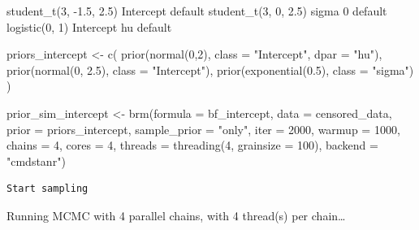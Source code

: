 \documentclass[
]{article}
\newenvironment{Shaded}{\begin{snugshade}}{\end{snugshade}}
\newcommand{\AttributeTok}[1]{\textcolor[rgb]{0.40,0.45,0.13}{#1}}
\newcommand{\DecValTok}[1]{\textcolor[rgb]{0.68,0.00,0.00}{#1}}
\newcommand{\FloatTok}[1]{\textcolor[rgb]{0.68,0.00,0.00}{#1}}
\newcommand{\FunctionTok}[1]{\textcolor[rgb]{0.28,0.35,0.67}{#1}}
\newcommand{\NormalTok}[1]{\textcolor[rgb]{0.00,0.23,0.31}{#1}}
\newcommand{\OtherTok}[1]{\textcolor[rgb]{0.00,0.23,0.31}{#1}}
\newcommand{\StringTok}[1]{\textcolor[rgb]{0.13,0.47,0.30}{#1}}
\begin{document}
student\_t(3, -1.5, 2.5) Intercept default student\_t(3, 0, 2.5) sigma 0
default logistic(0, 1) Intercept hu default

\begin{Shaded}
\begin{Highlighting}[]
\NormalTok{priors\_intercept }\OtherTok{\textless{}{-}} \FunctionTok{c}\NormalTok{(}
  \FunctionTok{prior}\NormalTok{(}\FunctionTok{normal}\NormalTok{(}\DecValTok{0}\NormalTok{,}\DecValTok{2}\NormalTok{), }\AttributeTok{class =} \StringTok{"Intercept"}\NormalTok{, }\AttributeTok{dpar =} \StringTok{"hu"}\NormalTok{),}
  \FunctionTok{prior}\NormalTok{(}\FunctionTok{normal}\NormalTok{(}\DecValTok{0}\NormalTok{, }\FloatTok{2.5}\NormalTok{), }\AttributeTok{class =} \StringTok{"Intercept"}\NormalTok{),}
  \FunctionTok{prior}\NormalTok{(}\FunctionTok{exponential}\NormalTok{(}\FloatTok{0.5}\NormalTok{), }\AttributeTok{class =} \StringTok{"sigma"}\NormalTok{)}
\NormalTok{)}

\NormalTok{prior\_sim\_intercept }\OtherTok{\textless{}{-}} \FunctionTok{brm}\NormalTok{(}\AttributeTok{formula =}\NormalTok{ bf\_intercept,}
                 \AttributeTok{data =}\NormalTok{ censored\_data,}
                 \AttributeTok{prior =}\NormalTok{ priors\_intercept,}
                 \AttributeTok{sample\_prior =} \StringTok{"only"}\NormalTok{,}
                 \AttributeTok{iter =} \DecValTok{2000}\NormalTok{, }\AttributeTok{warmup =} \DecValTok{1000}\NormalTok{, }\AttributeTok{chains =} \DecValTok{4}\NormalTok{, }\AttributeTok{cores =} \DecValTok{4}\NormalTok{,}
                 \AttributeTok{threads =} \FunctionTok{threading}\NormalTok{(}\DecValTok{4}\NormalTok{, }\AttributeTok{grainsize =} \DecValTok{100}\NormalTok{),}
                 \AttributeTok{backend =} \StringTok{"cmdstanr"}\NormalTok{)}
\end{Highlighting}
\end{Shaded}

\begin{verbatim}
Start sampling
\end{verbatim}

Running MCMC with 4 parallel chains, with 4 thread(s) per chain\ldots{}
\end{document}
